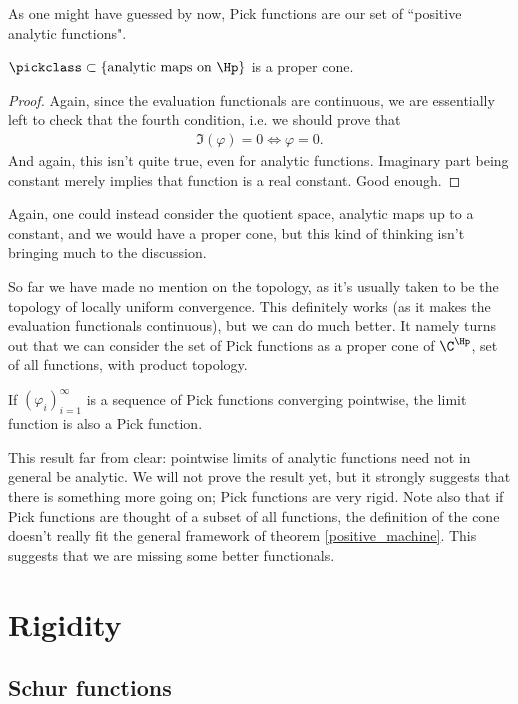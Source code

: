 As one might have guessed by now, Pick functions are our set of ``positive analytic functions".

\begin{lause}
	$\pickclass \subset \{\text{analytic maps on $\Hp$} \}$ is a proper cone.
\end{lause}
\begin{proof}
	Again, since the evaluation functionals are continuous, we are essentially left to check that the fourth condition, i.e. we should prove that
	\begin{align*}
		\Im(\varphi) = 0 \Leftrightarrow \varphi = 0.
	\end{align*}
	And again, this isn't quite true, even for analytic functions. Imaginary part being constant merely implies that function is a real constant. Good enough.
\end{proof}

Again, one could instead consider the quotient space, analytic maps up to a constant, and we would have a proper cone, but this kind of thinking isn't bringing much to the discussion.

So far we have made no mention on the topology, as it's usually taken to be the topology of locally uniform convergence. This definitely works (as it makes the evaluation functionals continuous), but we can do much better. It namely turns out that we can consider the set of Pick functions as a proper cone of $\C^{\Hp}$, set of all functions, with product topology.

\begin{prop}\label{pick_convergence}
	If $(\varphi_{i})_{i = 1}^{\infty}$ is a sequence of Pick functions converging pointwise, the limit function is also a Pick function.
\end{prop}

This result far from clear: pointwise limits of analytic functions need not in general be analytic. We will not prove the result yet, but it strongly suggests that there is something more going on; Pick functions are very rigid. Note also that if Pick functions are thought of a subset of all functions, the definition of the cone doesn't really fit the general framework of theorem \ref{positive_machine}. This suggests that we are missing some better functionals.

\section{Rigidity}

\subsection{Schur functions}

